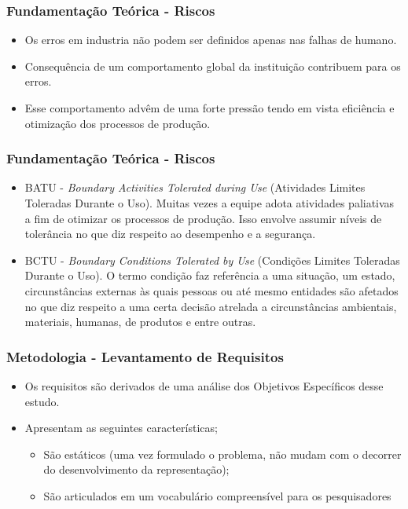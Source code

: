 \documentclass{beamer}
\begin{document}
\begin{frame}
	\frametitle{Fundamentação Teórica - Riscos}
	\begin{itemize}
		\item Os erros em industria não podem ser definidos apenas nas falhas de humano. 
		\item Consequência de um comportamento global da instituição contribuem para os erros. 
		\item Esse comportamento advêm de uma forte pressão tendo em vista eficiência e otimização dos processos de produção. 
	\end{itemize}
\end{frame}

\begin{frame}
	\frametitle{Fundamentação Teórica - Riscos}
	\begin{itemize}
		\item BATU - \textit{Boundary Activities Tolerated during Use} (Atividades Limites Toleradas Durante o Uso). Muitas vezes a equipe adota atividades paliativas a fim de otimizar os processos de produção. Isso envolve assumir níveis de tolerância no que diz respeito ao desempenho e a segurança. 
		\item BCTU - \textit{Boundary Conditions Tolerated by Use} (Condições Limites Toleradas Durante o Uso). O termo condição faz referência a uma situação, um estado, circunstâncias externas às quais pessoas ou até mesmo entidades são afetados no que diz respeito a uma certa decisão atrelada a circunstâncias ambientais, materiais, humanas, de produtos e entre outras.
	\end{itemize}
\end{frame}

\begin{frame}
	\frametitle{Metodologia - Levantamento de Requisitos}
	\begin{itemize}
		\item Os requisitos são derivados de uma análise dos Objetivos Específicos desse estudo.
		\item Apresentam as seguintes características; 
		\begin{itemize}
			\item São estáticos (uma vez formulado o problema, não mudam com o decorrer do desenvolvimento da representação);
			\item São articulados em um vocabulário compreensível para os pesquisadores			
		\end{itemize}
	\end{itemize}
\end{frame}
\end{document}
